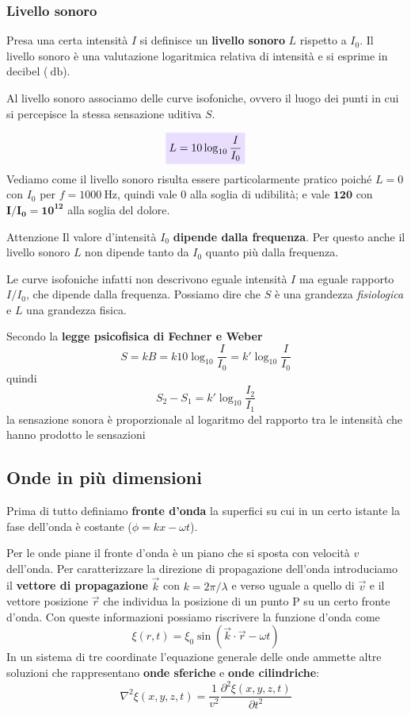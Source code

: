 \documentclass[x11names]{article}
\newcommand{\viola}[1]{\colorbox{myred}{$\displaystyle #1$}}
\begin{document}
	
	
	
	
	
	\subsubsection{Livello sonoro}
	Presa una certa intensità \(I\) si definisce un \textbf{livello sonoro} \(L\) rispetto a \(I_0\). Il livello sonoro è una valutazione logaritmica relativa di intensità e si esprime in decibel (\(\SI{}{\decibel}\)).
	
	Al livello sonoro associamo delle curve isofoniche, ovvero il luogo dei punti in cui si percepisce la stessa sensazione uditiva \(S\). 
	
	\begin{equation}\label{livello sonoro}
		\viola{L = 10\log_{10}{\frac{I}{I_0}}}
	\end{equation}
	Vediamo come il livello sonoro risulta essere particolarmente pratico poiché \(L = 0\) con \(I_0\) per \(f=1000\SI{}{\hertz}\), quindi vale 0 alla soglia di udibilità; e vale \(\boldsymbol{120}\) con \(\boldsymbol{I/I_0 = 10^{12}}\) alla soglia del dolore.
	
	\begin{es}{Attenzione}
		Il valore d'intensità \(I_0\) \textbf{dipende dalla frequenza}. Per questo anche il livello sonoro \(L\) non dipende tanto da \(I_0\) quanto più dalla frequenza. 
		
		Le curve isofoniche infatti non descrivono eguale intensità \(I\) ma eguale rapporto \(I/I_0\), che dipende dalla frequenza. Possiamo dire che \(S\) è una grandezza \textit{fisiologica} e \(L\) una grandezza fisica.
	\end{es}
	Secondo la \textbf{legge psicofisica di Fechner e Weber}
	\[ 
	S = kB = k10\log_10{\frac{I}{I_0}} = k'\log_10{\frac{I}{I_0}}
	\]
	quindi
	\begin{equation}
		S_2 - S_1 = k'\log_10{\frac{I_2}{I_1}}
	\end{equation}
	la sensazione sonora è proporzionale al logaritmo del rapporto tra le intensità che hanno prodotto le sensazioni
	
	
	\newpage
	\subsection{Onde in più dimensioni}	
	Prima di tutto definiamo \textbf{fronte d'onda} la superfici su cui in un certo istante la fase dell'onda è costante (\(\phi = kx -\omega t\)). 

	Per le onde piane il fronte d'onda è un piano che si sposta con velocità \(v\) dell'onda. Per caratterizzare la direzione di propagazione dell'onda introduciamo il \textbf{vettore di propagazione} \(\vec{k}\) con \(k = 2\pi/\lambda\) e verso uguale a quello di \(\vec{v}\) e il vettore posizione \(\vec{r}\) che individua la posizione di un punto P su un certo fronte d'onda. Con queste informazioni possiamo riscrivere la funzione d'onda come
	\[ 
	\xi(r,t) = \xi_0 \sin\left(\vec{k}\cdot \vec{r}- \omega t\right) 
	\]
	In un sistema di tre coordinate l'equazione generale delle onde ammette altre soluzioni che rappresentano \textbf{onde sferiche} e \textbf{onde cilindriche}: 
	\[ 
	\nabla^2\xi (x,y,z,t) = \frac{1}{v^2}\frac{\partial^2\xi (x,y,z,t)}{\partial t^2}
	\]
\end{document}
